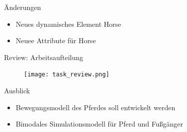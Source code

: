 \begin{frame}{Änderungen}
	\begin{itemize}
		\item Neues dynamisches Element Horse
		\item Neuee Attribute für Horse
	\end{itemize}
\end{frame}

\begin{frame}{Review: Arbeitsaufteilung}
	\begin{figure}
		\texttt{[image: task\_review.png]}
	\end{figure}
\end{frame}
\begin{frame}{Ausblick}
	\begin{itemize}
		\item Bewegungsmodell des Pferdes soll entwickelt werden
		\item Bimodales Simulationsmodell für Pferd und Fußgänger
	\end{itemize}
\end{frame}
